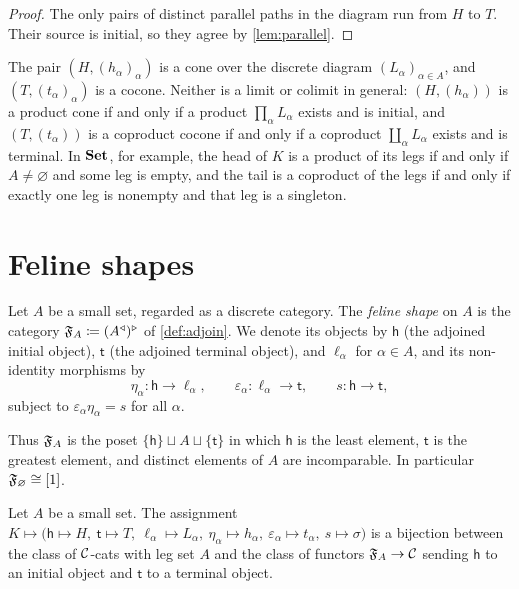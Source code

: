 \begin{proof}
The only pairs of distinct parallel paths in the diagram run from $H$ to $T$.
Their source is initial, so they agree by \cref{lem:parallel}.
\end{proof}

\begin{remark}\label{rem:head-not-product}
The pair $(H,(h_\alpha)_\alpha)$ is a cone over the discrete diagram
$(L_\alpha)_{\alpha\in A}$, and $(T,(t_\alpha)_\alpha)$ is a cocone. Neither
is a limit or colimit in general: $(H,(h_\alpha))$ is a product cone if and
only if a product $\prod_\alpha L_\alpha$ exists and is initial, and
$(T,(t_\alpha))$ is a coproduct cocone if and only if a coproduct
$\coprod_\alpha L_\alpha$ exists and is terminal. In $\mathbf{Set}$, for example, the
head of $K$ is a product of its legs if and only if $A\neq\varnothing$ and some
leg is empty, and the tail is a coproduct of the legs if and only if exactly
one leg is nonempty and that leg is a singleton.
\end{remark}

\section{Feline shapes}\label{sec:shapes}

\begin{definition}\label{def:feline-shape}
Let $A$ be a small set, regarded as a discrete category. The \emph{feline shape}
on $A$ is the category $\mathfrak{F}_A\coloneqq(A^{\triangleleft})^{\triangleright}$ of
\cref{def:adjoin}. We denote its objects by $\mathsf h$ (the adjoined initial
object), $\mathsf t$ (the adjoined terminal object), and $\ell_\alpha$ for
$\alpha\in A$, and its non-identity morphisms by
\[
\eta_\alpha\colon\mathsf h\to\ell_\alpha,\qquad
\varepsilon_\alpha\colon\ell_\alpha\to\mathsf t,\qquad
s\colon\mathsf h\to\mathsf t,
\]
subject to $\varepsilon_\alpha\eta_\alpha=s$ for all $\alpha$.
\end{definition}

Thus $\mathfrak{F}_A$ is the poset $\{\mathsf h\}\sqcup A\sqcup\{\mathsf t\}$ in which
$\mathsf h$ is the least element, $\mathsf t$ is the greatest element, and
distinct elements of $A$ are incomparable. In particular $\mathfrak{F}_\varnothing\cong[1]$.

\begin{proposition}\label{prop:cat-as-functor}
Let $A$ be a small set. The assignment
$K\mapsto\bigl(\mathsf h\mapsto H,\ \mathsf t\mapsto T,\ \ell_\alpha\mapsto L_\alpha,\
\eta_\alpha\mapsto h_\alpha,\ \varepsilon_\alpha\mapsto t_\alpha,\ s\mapsto\sigma\bigr)$
is a bijection between the class of $\mathcal{C}$-cats with leg set $A$ and the class of
functors $\mathfrak{F}_A\to\mathcal{C}$ sending $\mathsf h$ to an initial object and $\mathsf t$
to a terminal object.
\end{proposition}

